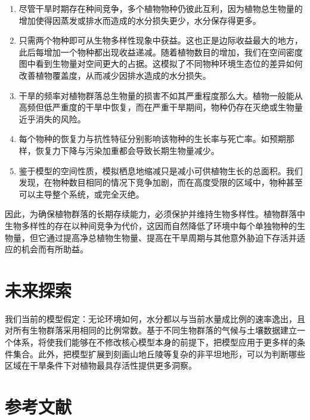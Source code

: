 \documentclass[11pt,a4paper]{ctexart}
\begin{document}
\begin{enumerate}
\item 尽管干旱时期存在种间竞争，多个植物物种仍彼此互利，因为植物总生物量的增加使得因蒸发或排水而造成的水分损失更少，水分保存得更多。
\item 只需两个物种即可从生物多样性现象中获益。这也正是边际收益最大的地方，此后每增加一个物种都出现收益递减。随着植物数目的增加，我们在空间密度图中看到生物量对空间更大的占据。这模拟了不同物种环境生态位的差异如何改善植物覆盖度，从而减少因排水造成的水分损失。
\item 干旱的频率对植物群落总生物量的损害不如其严重程度那么大。植物一般能从高频但低严重度的干旱中恢复，而在严重干旱期间，物种仍存在灭绝或生物量近乎消失的风险。
\item 每个物种的恢复力与抗性特征分别影响该物种的生长率与死亡率。如预期那样，恢复力下降与污染加重都会导致长期生物量减少。
\item 鉴于模型的空间性质，模拟栖息地缩减只是减小可供植物生长的总面积。我们发现，在物种数目相同的情况下竞争加剧，而在高度受限的区域中，物种甚至可以主导整个系统，或完全灭绝。
\end{enumerate}

因此，为确保植物群落的长期存续能力，必须保护并维持生物多样性。植物群落中生物多样性的存在以种间竞争为代价，这因而自然降低了环境中每个单独物种的生物量，但它通过提高净总植物生物量、提高在干旱周期与其他意外胁迫下存活并适应的机会而有所助益。

\section{未来探索}

我们当前的模型假定：无论环境如何，水分都以与当前水量成比例的速率逸出，且对所有生物群落采用相同的比例常数。基于不同生物群落的气候与土壤数据建立一个体系，将使我们能够在不修改核心模型本身的前提下，把模型应用于更多样的条件集合。此外，把模型扩展到刻画山地丘陵等复杂的非平坦地形，可以为判断哪些区域在干旱条件下对植物最具存活性提供更多洞察。

\section*{参考文献}
\end{document}
